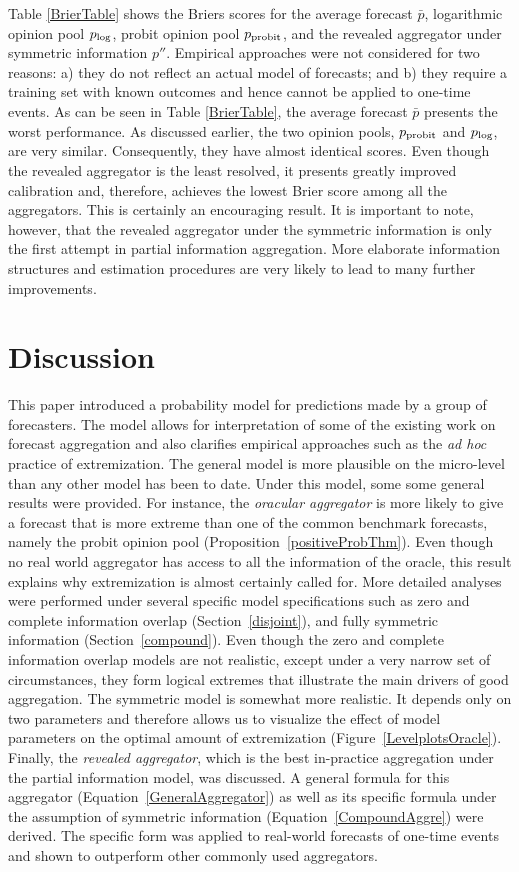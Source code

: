 \documentclass[11pt]{article}
\theoremstyle{definition}
\theoremstyle{definition}
\def\probit{p_{\rm probit}}
\def\plog{p_{\rm log}}
\begin{document}
Table \ref{BrierTable} shows the Briers scores for the average
forecast $\bar{p}$, logarithmic opinion pool $\plog$, probit opinion
pool $\probit$, and the revealed aggregator under symmetric
information $p''$. Empirical approaches were not considered for two
reasons: a) they do not reflect an actual model of forecasts; and b)
they require a training set with known outcomes and hence cannot be
applied to one-time events. As can be seen in Table \ref{BrierTable},
the average forecast $\bar{p}$ presents the worst performance. As
discussed earlier, the two opinion pools, $\probit$ and $\plog$, are
very similar. Consequently, they have almost identical scores. Even
though the revealed aggregator is the least resolved, it presents
greatly improved calibration and, therefore, achieves the lowest Brier
score among all the aggregators. This is certainly an encouraging
result. It is important to note, however, that the revealed aggregator
under the symmetric information is only the first attempt in partial
information aggregation. More elaborate information structures and
estimation procedures are very likely to lead to many further
improvements.

\section{Discussion}
\label{discussion}
This paper introduced a probability model for predictions made by
a group of forecasters.  The model allows for interpretation of some
of the existing work on forecast aggregation and also clarifies
empirical approaches such as the {\em ad hoc} practice of
extremization.  The general model is more plausible on the micro-level
than any other model has been to date. Under this model, some 
some general results were provided. For instance, the
\textit{oracular aggregator} is more likely to give a forecast that is
more extreme than one of the common benchmark forecasts, namely the
probit opinion pool (Proposition~\ref{positiveProbThm}).  Even though
no real world aggregator has access to all the information of the
oracle, this result explains why extremization is almost certainly
called for.  More detailed analyses  were performed under several
specific model specifications such as zero and complete information
overlap (Section~\ref{disjoint}), and fully symmetric information (Section~\ref{compound}).  Even though the zero and complete
information overlap models are not realistic, except under a very
narrow set of circumstances, they form logical extremes that illustrate the main drivers of good aggregation. The symmetric model is somewhat
more realistic. It depends only on two parameters and therefore allows us to visualize the effect of model parameters on the optimal amount of
extremization (Figure~\ref{LevelplotsOracle}).  Finally, the
{\em revealed aggregator}, which is the best in-practice aggregation
under the partial information model, was discussed. A general formula for
this aggregator (Equation~\ref{GeneralAggregator}) as well as its
specific formula under the assumption of symmetric information
(Equation~\ref{CompoundAggre}) were derived. The specific form was applied to real-world forecasts 
of one-time events and shown to 
outperform other commonly used aggregators. 
\end{document}
